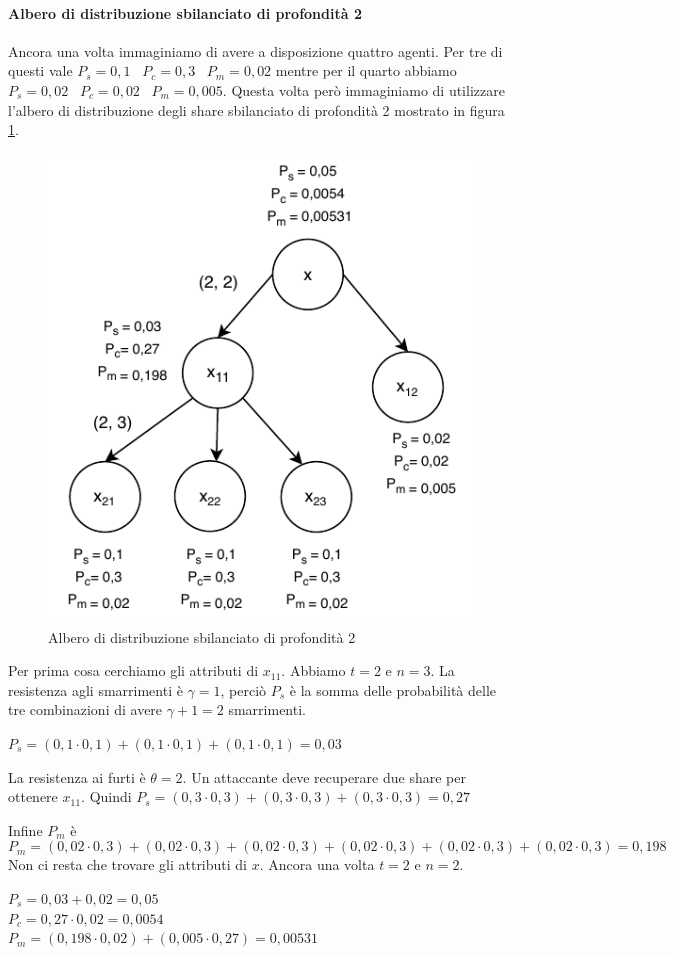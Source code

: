 \paragraph{Albero di distribuzione sbilanciato di profondità 2}
Ancora una volta immaginiamo di avere a disposizione quattro agenti. Per tre di questi
vale
$ P_s = 0,1 $ \,
$ P_c = 0,3 $ \,
$ P_m = 0,02 $
mentre per il quarto abbiamo
$ P_s = 0,02 $ \,
$ P_c = 0,02 $ \,
$ P_m = 0,005 $.
Questa volta però immaginiamo di utilizzare l'albero di distribuzione degli share
sbilanciato di profondità 2
mostrato in figura \ref{fig:robustezza-2-3}.
\begin{figure}[H]
	\centering
	\includegraphics[width=0.6\linewidth]{images/chap_analisi_robustezza/robustezza-2-3.pdf}
	\caption{Albero di distribuzione sbilanciato di profondità 2}
	\label{fig:robustezza-2-3}
\end{figure}
Per prima cosa cerchiamo gli attributi di $ x_{11} $.
Abbiamo $ t = 2 $ e $ n = 3 $. La resistenza agli smarrimenti è $ \gamma = 1 $, perciò $ P_s $
è la somma delle probabilità delle tre combinazioni di avere $ \gamma + 1 = 2 $ smarrimenti.
\begin{tightcenter}
	$ P_s = (0,1 \cdot 0,1) + (0,1 \cdot 0,1) + (0,1 \cdot 0,1) = 0,03 $
\end{tightcenter}

La resistenza ai furti è $ \theta = 2 $. Un attaccante deve recuperare
due share per ottenere $ x_{11} $. Quindi
$ P_s = (0,3 \cdot 0,3) + (0,3 \cdot 0,3) + (0,3 \cdot 0,3) = 0,27 $

Infine $ P_m $ è
$$
	P_m = (0,02 \cdot 0,3) + (0,02 \cdot 0,3) +
	(0,02 \cdot 0,3) + (0,02 \cdot 0,3) +
	(0,02 \cdot 0,3) + (0,02 \cdot 0,3) = 0,198
$$
Non ci resta che trovare gli attributi di $ x $.
Ancora una volta $ t = 2 $ e $ n = 2 $.
\begin{tightcenter}
	$ P_s = 0,03 + 0,02 = 0,05 $      \\
	$ P_c = 0,27 \cdot 0,02 = 0,0054 $\\
	$ P_m = (0,198 \cdot 0,02) + (0,005 \cdot 0,27) = 0,00531 $
\end{tightcenter}

